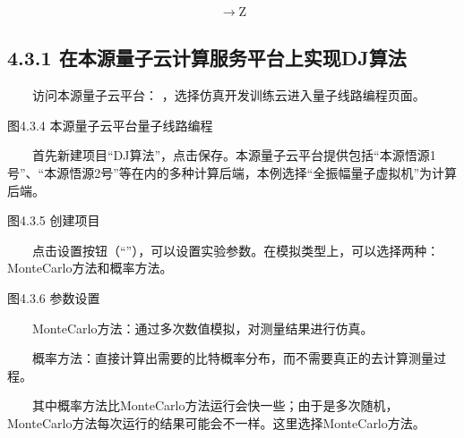 \documentclass[a4paper,11pt,english]{sphinxmanual}
\begin{document}
\begin{equation*}
\begin{split}\rightarrow \mathrm{Z}\end{split}
\end{equation*}

\subsection{4.3.1 在本源量子云计算服务平台上实现D\sphinxhyphen{}J算法}
\label{\detokenize{rst/4.3Deutsch-Josza_u7b97_u6cd5:d-j}}
\sphinxAtStartPar
  访问本源量子云平台： ，选择仿真开发训练云进入量子线路编程页面。


\begin{center}图4.3.4 本源量子云平台量子线路编程
\end{center}
\sphinxAtStartPar
  首先新建项目“D\sphinxhyphen{}J算法”，点击保存。本源量子云平台提供包括“本源悟源1号”、“本源悟源2号”等在内的多种计算后端，本例选择“全振幅量子虚拟机”为计算后端。


\begin{center}图4.3.5 创建项目
\end{center}
\sphinxAtStartPar
  点击设置按钮（“”），可以设置实验参数。在模拟类型上，可以选择两种：Monte\sphinxhyphen{}Carlo方法和概率方法。


\begin{center}图4.3.6 参数设置
\end{center}
\sphinxAtStartPar
  Monte\sphinxhyphen{}Carlo方法：通过多次数值模拟，对测量结果进行仿真。

\sphinxAtStartPar
  概率方法：直接计算出需要的比特概率分布，而不需要真正的去计算测量过程。

\sphinxAtStartPar
  其中概率方法比Monte\sphinxhyphen{}Carlo方法运行会快一些；由于是多次随机，Monte\sphinxhyphen{}Carlo方法每次运行的结果可能会不一样。这里选择Monte\sphinxhyphen{}Carlo方法。
\end{document}
